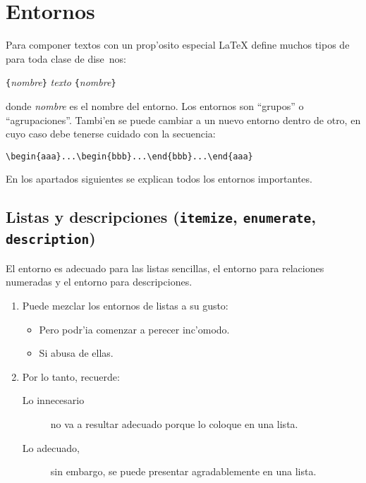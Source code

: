 \section{Entornos} \label{env}

Para componer textos con un prop'osito especial \LaTeX{} define muchos
tipos de  para toda clase de dise~nos:
\begin{command}
\verb|{|\emph{nombre}\verb|}|\quad
   \emph{texto}\quad
{}\verb|{|\emph{nombre}\verb|}|
\end{command}
\noindent donde \emph{nombre} es el nombre del entorno. Los entornos
son ``grupos'' o ``agrupaciones''. Tambi'en se puede cambiar a un
nuevo entorno dentro de otro, en cuyo caso debe tenerse cuidado con la
secuencia:
\begin{code}
\verb|\begin{aaa}...\begin{bbb}...\end{bbb}...\end{aaa}|
\end{code}

En los apartados siguientes se explican todos los entornos importantes.

\subsection{Listas y descripciones (\texttt{itemize},
  \texttt{enumerate}, \texttt{description})}

El entorno  es adecuado para las listas sencillas, el
entorno  para relaciones numeradas y el entorno
 para descripciones.

\begin{example}
\begin{enumerate}
\item Puede mezclar los entornos
de listas a su gusto:
\begin{itemize}
\item Pero podr'ia comenzar a
perecer inc'omodo.
\item Si abusa de ellas.
\end{itemize}
\item Por lo tanto, recuerde:
\begin{description}
\item[Lo innecesario] no va a
resultar adecuado porque
lo coloque en una lista.
\item[Lo adecuado,] sin embargo,
se puede presentar agradablemente
en una lista.
\end{description}
\end{enumerate}
\end{example}

